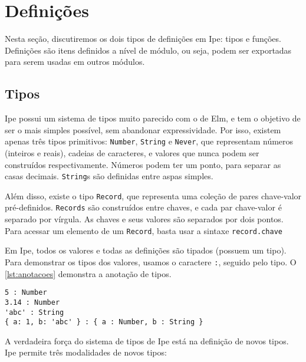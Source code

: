 \section{Definições}\label{sec:definicoes}

Nesta seção, discutiremos os dois tipos de definições em Ipe: tipos e funções.
Definições são itens definidos a nível de módulo, ou seja, podem ser exportadas
para serem usadas em outros módulos.

\subsection{Tipos}\label{sec:tipos}

Ipe possui um sistema de tipos muito parecido com o de Elm, e tem o objetivo de
ser o mais simples possível, sem abandonar expressividade. Por isso, existem
apenas três tipos primitivos: \texttt{Number}, \texttt{String} e \texttt{Never},
que representam números (inteiros e reais), cadeias de caracteres, e valores que
nunca podem ser construídos respectivamente. Números podem ter um ponto,
para separar as casas decimais. \texttt{String}s são definidas entre aspas simples.

Além disso, existe o tipo \texttt{Record}, que representa uma coleção de pares
chave-valor pré-definidos. \texttt{Records} são construídos entre chaves, e cada
par chave-valor é separado por vírgula. As chaves e seus valores são separados por
dois pontos. Para acessar um elemento de um \texttt{Record}, basta usar a sintaxe
\texttt{record.chave}


Em Ipe, todos os valores e todas as definições são tipados (possuem um tipo). Para
demonstrar os tipos dos valores, usamos o caractere \texttt{:}, seguido pelo tipo.
O \autoref{lst:anotacoes} demonstra a anotação de tipos.

\begin{lstlisting}[label={lst:anotacoes},caption={Exemplo de anotação de tipos}]
5 : Number
3.14 : Number
'abc' : String
{ a: 1, b: 'abc' } : { a : Number, b : String }
\end{lstlisting}

A verdadeira força do sistema de tipos de Ipe está na definição de novos tipos.
Ipe permite três modalidades de novos tipos:

